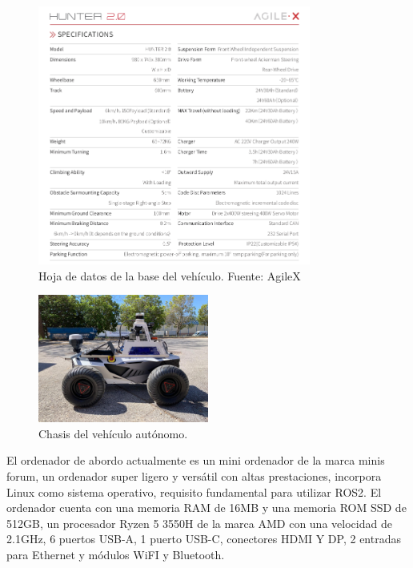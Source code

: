 \begin{figure}[H]
    \centering
    \includegraphics[width=0.8\textwidth]{images/hunter_datasheet.png}
    \caption{Hoja de datos de la base del vehículo. Fuente: AgileX}
    \label{fig:datasheet_hunter}
\end{figure}

\begin{figure}[h]
    \centering
    \includegraphics[width=0.5\textwidth]{images/hunter_v2.jpeg}
    \caption{Chasis del vehículo autónomo.}
    \label{fig:hunter}
\end{figure}

El ordenador de abordo actualmente es un mini ordenador de la marca minis forum, un ordenador super ligero y versátil con altas 
prestaciones, incorpora Linux como sistema operativo, requisito fundamental para utilizar ROS2. El ordenador cuenta con una 
memoria RAM de 16MB y una memoria ROM SSD de 512GB, un procesador Ryzen 5 3550H de la marca AMD con una velocidad de 2.1GHz, 6 puertos USB-A, 
1 puerto USB-C, conectores HDMI Y DP, 2 entradas para Ethernet y módulos WiFI y Bluetooth.

